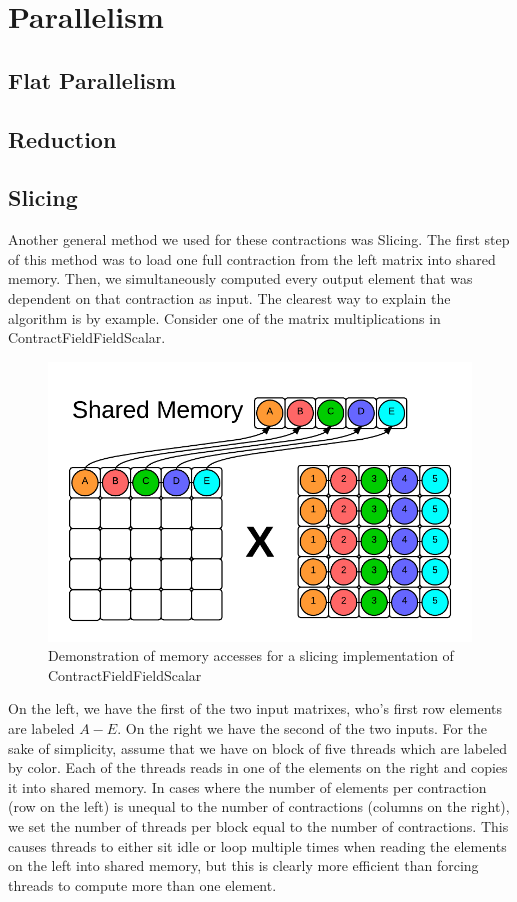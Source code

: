 \chapter{Parallelism}

\section{Flat Parallelism}

\section{Reduction}

\section{Slicing}
Another general method we used for these contractions was Slicing. The first step of this method was to load one full contraction from the left matrix into shared memory. Then, we simultaneously computed every output element that was dependent on that contraction as input. The clearest way to explain the algorithm is by example. Consider one of the matrix multiplications in ContractFieldFieldScalar. 

\begin{figure}
    \centering
    \includegraphics[scale = .55]{ContractFieldFieldScalarGraphic}
    \caption{Demonstration of memory accesses for a slicing implementation of ContractFieldFieldScalar}
\end{figure}

	On the left, we have the first of the two input matrixes, who's first row elements are labeled $A-E$. On the right we have the second of the two inputs. For the sake of simplicity, assume that we have on block of five threads which are labeled by color. Each of the threads reads in one of the elements on the right and copies it into shared memory. In cases where the number of elements per contraction (row on the left) is unequal to the number of contractions (columns on the right), we set the number of threads per block equal to the number of contractions. This causes threads to either sit idle or loop multiple times when reading the elements on the left into shared memory, but this is clearly more efficient than forcing threads to compute more than one element.
	
